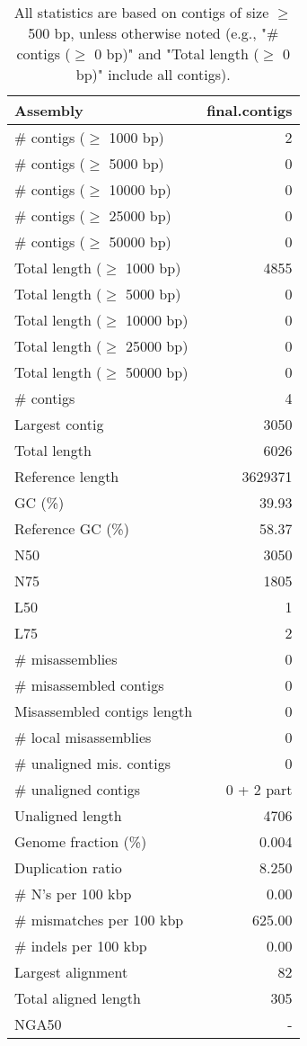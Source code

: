 \documentclass[12pt,a4paper]{article}
\begin{document}
\begin{table}[ht]
\begin{center}
\caption{All statistics are based on contigs of size $\geq$ 500 bp, unless otherwise noted (e.g., "\# contigs ($\geq$ 0 bp)" and "Total length ($\geq$ 0 bp)" include all contigs).}
\begin{tabular}{|l*{1}{|r}|}
\hline
Assembly & final.contigs \\ \hline
\# contigs ($\geq$ 1000 bp) & 2 \\ \hline
\# contigs ($\geq$ 5000 bp) & 0 \\ \hline
\# contigs ($\geq$ 10000 bp) & 0 \\ \hline
\# contigs ($\geq$ 25000 bp) & 0 \\ \hline
\# contigs ($\geq$ 50000 bp) & 0 \\ \hline
Total length ($\geq$ 1000 bp) & 4855 \\ \hline
Total length ($\geq$ 5000 bp) & 0 \\ \hline
Total length ($\geq$ 10000 bp) & 0 \\ \hline
Total length ($\geq$ 25000 bp) & 0 \\ \hline
Total length ($\geq$ 50000 bp) & 0 \\ \hline
\# contigs & 4 \\ \hline
Largest contig & 3050 \\ \hline
Total length & 6026 \\ \hline
Reference length & 3629371 \\ \hline
GC (\%) & 39.93 \\ \hline
Reference GC (\%) & 58.37 \\ \hline
N50 & 3050 \\ \hline
N75 & 1805 \\ \hline
L50 & 1 \\ \hline
L75 & 2 \\ \hline
\# misassemblies & 0 \\ \hline
\# misassembled contigs & 0 \\ \hline
Misassembled contigs length & 0 \\ \hline
\# local misassemblies & 0 \\ \hline
\# unaligned mis. contigs & 0 \\ \hline
\# unaligned contigs & 0 + 2 part \\ \hline
Unaligned length & 4706 \\ \hline
Genome fraction (\%) & 0.004 \\ \hline
Duplication ratio & 8.250 \\ \hline
\# N's per 100 kbp & 0.00 \\ \hline
\# mismatches per 100 kbp & 625.00 \\ \hline
\# indels per 100 kbp & 0.00 \\ \hline
Largest alignment & 82 \\ \hline
Total aligned length & 305 \\ \hline
NGA50 & - \\ \hline
\end{tabular}
\end{center}
\end{table}
\end{document}
